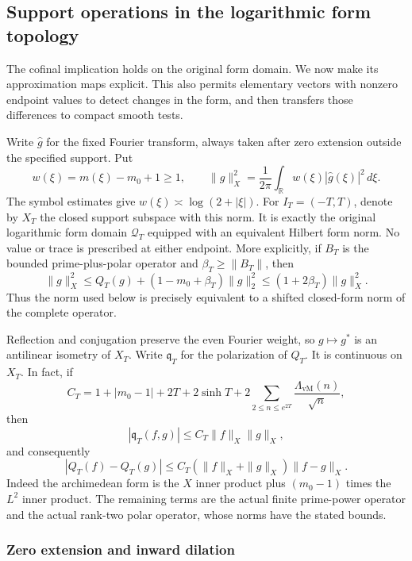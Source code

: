 \subsection{Support operations in the logarithmic form topology}
\label{sec:window-support-topology}

The cofinal implication holds on the original form domain.  We now
make its approximation maps explicit.  This also permits elementary
vectors with nonzero endpoint values to detect changes in the form,
and then transfers those differences to compact smooth tests.

Write $\widehat g$ for the fixed Fourier transform, always taken
after zero extension outside the specified support.  Put
\[
 w(\xi)=m(\xi)-m_0+1\ge1,\qquad
 \|g\|_X^2=\frac1{2\pi}\int_{\mathbb R}
                 w(\xi)|\widehat g(\xi)|^2\,d\xi.
\]
The symbol estimates give
$w(\xi)\asymp\log(2+|\xi|)$.  For $I_T=(-T,T)$, denote by
$X_T$ the closed support subspace with this norm.  It is exactly
the original logarithmic form domain $\mathcal Q_T$ equipped
with an equivalent Hilbert form norm.  No value or trace is
prescribed at either endpoint.
More explicitly, if $B_T$ is the bounded prime-plus-polar
operator and $\beta_T\ge\|B_T\|$, then
\[
 \|g\|_X^2\le
 Q_T(g)+(1-m_0+\beta_T)\|g\|_2^2
 \le(1+2\beta_T)\|g\|_X^2.
\]
Thus the norm used below is precisely equivalent to a shifted
closed-form norm of the complete operator.

Reflection and conjugation preserve the even Fourier weight, so
$g\mapsto g^*$ is an antilinear isometry of $X_T$.
Write $\mathfrak q_T$ for the polarization of $Q_T$.  It is
continuous on $X_T$.  In fact, if
\[
 C_T=1+|m_0-1|+2T+2\sinh T
              +2\sum_{2\le n\le e^{2T}}\frac{\Lambda_{\mathrm{vM}}(n)}{\sqrt n},
\]
then
\[
 |\mathfrak q_T(f,g)|\le C_T\|f\|_X\|g\|_X,
\]
and consequently
\begin{equation}
 |Q_T(f)-Q_T(g)|
 \le C_T(\|f\|_X+\|g\|_X)\|f-g\|_X.
 \label{eq:window-support-1}
\end{equation}
Indeed the archimedean form is the $X$ inner product plus
$(m_0-1)$ times the $L^2$ inner product.  The remaining terms
are the actual finite prime-power operator and the actual
rank-two polar operator, whose norms have the stated bounds.

\subsubsection{Zero extension and inward dilation}

